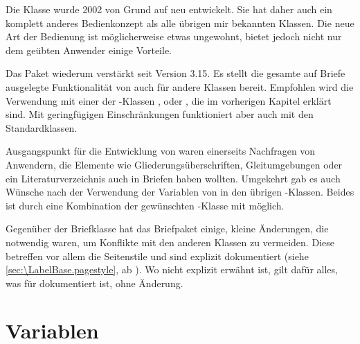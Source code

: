 Die Klasse  wurde 2002 von Grund
auf neu entwickelt. Sie hat daher auch ein komplett anderes Bedienkonzept als
alle übrigen mir bekannten Klassen. Die neue Art der Bedienung ist
möglicherweise etwas ungewohnt, bietet jedoch nicht nur dem geübten Anwender
einige Vorteile.

Das Paket %
 wiederum verstärkt \KOMAScript{} seit
Version 3.15. Es stellt die gesamte auf Briefe ausgelegte Funktionalität von
 auch für andere Klassen bereit. Empfohlen wird die Verwendung
mit einer der \KOMAScript-Klassen ,  oder
, die im vorherigen Kapitel erklärt sind. Mit geringfügigen
Einschränkungen funktioniert  aber auch mit den
Standardklassen.

Ausgangspunkt für die Entwicklung von  waren einerseits
Nachfragen von Anwendern, die Elemente wie
Gliederungsüberschriften, Gleitumgebungen oder ein Literaturverzeichnis auch in Briefen
haben wollten. Umgekehrt gab es auch Wünsche nach der Verwendung der Variablen
von  in den übrigen \KOMAScript-Klassen. Beides ist durch eine
Kombination der gewünschten \KOMAScript-Klasse mit 
möglich.

Gegenüber der Briefklasse hat das Briefpaket einige, kleine Änderungen, die
notwendig waren, um Konflikte mit den anderen Klassen zu vermeiden. Diese
betreffen vor allem die Seitenstile und sind explizit dokumentiert (siehe
\autoref{sec:\LabelBase.pagestyle}, ab
). Wo  nicht explizit
erwähnt ist, gilt dafür alles, was für  dokumentiert ist, ohne
Änderung.


\section{Variablen}
%
\BeginIndexGroup
{}%

